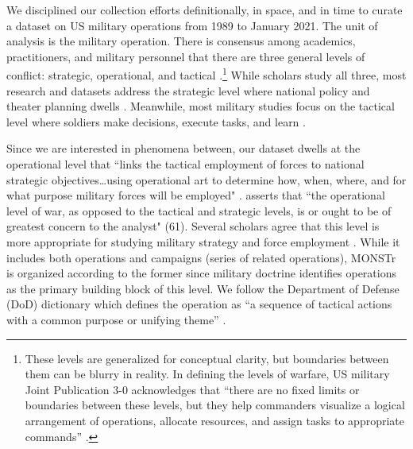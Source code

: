 \documentclass[fleqn,12pt]{article}
\begin{document}
We disciplined our collection efforts definitionally, in space, and in time to curate a dataset on US military operations from 1989 to January 2021. The unit of analysis is the military operation. There is consensus among academics, practitioners, and military personnel that there are three general levels of conflict: strategic, operational, and tactical \citep{clausewitz_war_1976, millett_effectivenessmilitaryorganizations_1986, zabecki_german1918offensives_2006}.\footnote{These levels are generalized for conceptual clarity, but boundaries between them can be blurry in reality. In defining the levels of warfare, US military Joint Publication 3-0 acknowledges that ``there are no fixed limits or boundaries between these levels, but they help commanders visualize a logical arrangement of operations, allocate resources, and assign tasks to appropriate commands” 
 \citep[I-12]{chairmanofthejointchiefsofstaff_jointpublication30_2018}.} While scholars study all three, most research and datasets address the strategic level where national policy and theater planning dwells \citep{mcmaster_derelictiondutyjohnson_1998, millett_lessonswar_1988}. Meanwhile, most military studies focus on the tactical level where soldiers make decisions, execute tasks, and learn \citep{harkness_militarymaladaptationcounterinsurgency_2015, kollars_warhorizonsoldierled_2015}.

Since we are interested in phenomena between, our dataset dwells at the operational level that ``links the tactical employment of forces to national strategic objectives…using operational art to determine how, when, where, and for what purpose military forces will be employed" \citep{chairmanofthejointchiefsofstaff_jointpublication30_2018}. \citet{luttwak_operationallevelwar_1981} asserts that ``the operational level of war, as opposed to the tactical and strategic levels, is or ought to be of greatest concern to the analyst" (61). Several scholars agree that this level is more appropriate for studying military strategy and force employment \citep{allen_understandingimpactair_2019, tecottmetz_casecampaignanalysis_2021}. While it includes both operations and campaigns (series of related operations), MONSTr is organized according to the former since military doctrine identifies operations as the primary building block of this level. We follow the Department of Defense (DoD) dictionary which defines the operation as ``a sequence of tactical actions with a common purpose or unifying theme” \citep[GL-13]{chairmanofthejointchiefsofstaff_doddictionarymilitary_2021}.
\end{document}
